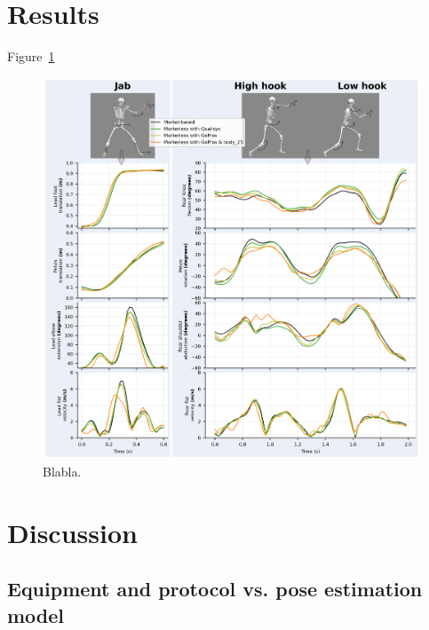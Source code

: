 \section{Results}

Figure~\ref{fig_graphkpi}

\begin{figure}[!ht]
	\centering
	\def\svgwidth{1\columnwidth}
	\fontsize{10pt}{10pt}\selectfont
	\includegraphics[width=\linewidth]{"../Chap6/Figures/Fig_GraphKPI.png"}
	\caption{Blabla.}
	\label{fig_graphkpi}
\end{figure}


\section{Discussion}
\subsection{Equipment and protocol vs. pose estimation model}

